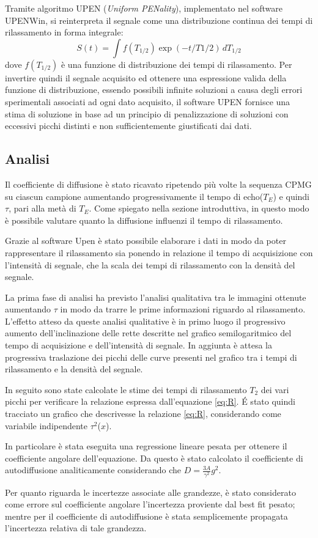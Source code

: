 Tramite algoritmo UPEN (\textit{Uniform PENality}), implementato nel software UPENWin, si reinterpreta il segnale come una distribuzione continua dei tempi di rilassamento in forma integrale:
\begin{equation}
	S(t) = \int f(T_{1/2}) \exp(-t/T{1/2}) \, dT_{1/2}
\end{equation}
dove $f(T_{1/2})$ è una funzione di distribuzione dei tempi di rilassamento. Per invertire quindi il segnale acquisito ed ottenere una espressione valida della funzione di distribuzione, essendo possibili infinite soluzioni a causa degli errori sperimentali associati ad ogni dato acquisito, il software UPEN fornisce una stima di soluzione in base ad un principio di penalizzazione di soluzioni con eccessivi picchi distinti e non sufficientemente giustificati dai dati.

\subsection*{Analisi}

Il coefficiente di diffusione è stato ricavato ripetendo più volte la sequenza CPMG su ciascun campione aumentando progressivamente il tempo di echo($T_E$) e quindi $\tau$, pari alla metà di $T_E$.
Come spiegato nella sezione introduttiva, in questo modo è possibile  valutare quanto la diffusione influenzi il tempo di rilassamento.

Grazie al software Upen è stato possibile elaborare i dati in modo da poter rappresentare il rilassamento sia ponendo in relazione il tempo di acquisizione con l'intensità di segnale, che la scala dei tempi di rilassamento con la densità del segnale.

La prima fase di analisi ha previsto l'analisi qualitativa tra le immagini ottenute aumentando $\tau$ in modo da trarre le prime informazioni riguardo al rilassamento.
L'effetto atteso da queste analisi qualitative è in primo luogo il progressivo aumento dell'inclinazione delle rette descritte nel grafico semilogaritmico del tempo di acquisizione e dell'intensità di segnale.
In aggiunta è attesa la progressiva traslazione dei picchi delle curve presenti nel grafico tra i tempi di rilassamento e la densità del segnale.

In seguito sono state calcolate le stime dei tempi di rilassamento $T_2$ dei vari picchi per verificare la relazione espressa dall'equazione \ref{eq:R}. 
\'E stato quindi tracciato un grafico che descrivesse la relazione \ref{eq:R}, considerando come variabile indipendente $\tau^2$($x$). 

In particolare è stata eseguita una regressione lineare pesata per ottenere il coefficiente angolare dell'equazione.
Da questo è stato calcolato il coefficiente di autodiffusione analiticamente considerando che $D=\frac{3A}{{\gamma}^2}g^2$.

Per quanto riguarda le incertezze associate alle grandezze, è stato considerato come errore sul coefficiente angolare l'incertezza proviente dal best fit pesato; mentre per il coefficiente di autodiffusione è stata semplicemente propagata l'incertezza relativa di tale grandezza.


